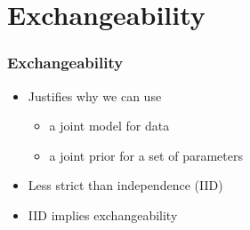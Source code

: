 \documentclass[10pt]{beamer}
\begin{document}
\section{Exchangeability}
\frame{\sectionpage}



\begin{frame}

\frametitle{Exchangeability}

  \begin{itemize}
  \item Justifies why we can use
    \begin{itemize}
    \item a joint model for data
    \item a joint prior for a set of parameters
    \end{itemize}
  \item Less strict than independence (IID)
  \item IID implies exchangeability
  \end{itemize}
\end{frame}
\end{document}
